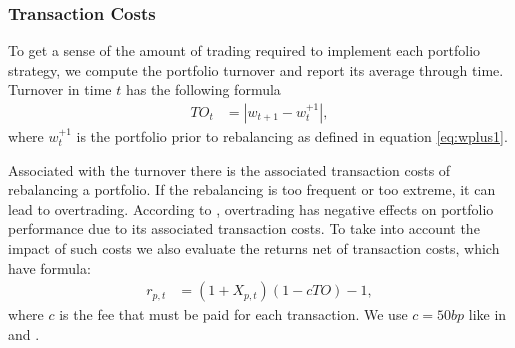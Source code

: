 \documentclass[preprint, doubleblind, authoryear,10pt]{elsarticle}
\begin{document}

% 

\subsubsection*{Transaction Costs}

To get a sense of the amount of trading required to implement each portfolio strategy, we compute the portfolio turnover and report its average through time.
Turnover in time $t$ has the following formula
\begin{align}
	\label{to}
	TO_{t} &= |w_{t+1} - w_{t}^{+1}|,
\end{align}
where $w_{t}^{+1}$ is the portfolio prior to rebalancing as defined in equation \eqref{eq:wplus1}.

Associated with the turnover there is the associated transaction costs of rebalancing a portfolio.
If the rebalancing is too frequent or too extreme, it can lead to overtrading.
According to \cite{barber-2000}, overtrading has negative effects on portfolio performance due to its associated transaction costs.
To take into account the impact of such costs we also evaluate the returns net of transaction costs, which have formula:
\begin{align}
	r_{p,t} &= (1 + X_{p,t} )(1 - c TO) - 1,
\end{align}
where $c$ is the fee that must be paid for each transaction.
We use $c=50bp$ like in \cite{dgu2009} and \cite{fko-2012}.

\end{document}
